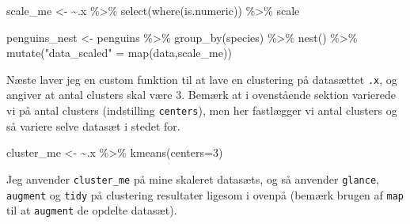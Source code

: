 \documentclass[
]{book}
\newenvironment{Shaded}{\begin{snugshade}}{\end{snugshade}}
\newcommand{\AttributeTok}[1]{\textcolor[rgb]{0.77,0.63,0.00}{#1}}
\newcommand{\DecValTok}[1]{\textcolor[rgb]{0.00,0.00,0.81}{#1}}
\newcommand{\ErrorTok}[1]{\textcolor[rgb]{0.64,0.00,0.00}{\textbf{#1}}}
\newcommand{\FunctionTok}[1]{\textcolor[rgb]{0.00,0.00,0.00}{#1}}
\newcommand{\NormalTok}[1]{#1}
\newcommand{\OtherTok}[1]{\textcolor[rgb]{0.56,0.35,0.01}{#1}}
\newcommand{\SpecialCharTok}[1]{\textcolor[rgb]{0.00,0.00,0.00}{#1}}
\newcommand{\StringTok}[1]{\textcolor[rgb]{0.31,0.60,0.02}{#1}}
\begin{document}
\begin{Shaded}
\begin{Highlighting}[]
\NormalTok{scale\_me }\OtherTok{\textless{}{-}} \ErrorTok{\textasciitilde{}}\NormalTok{.x }\SpecialCharTok{\%\textgreater{}\%} \FunctionTok{select}\NormalTok{(}\FunctionTok{where}\NormalTok{(is.numeric)) }\SpecialCharTok{\%\textgreater{}\%}\NormalTok{ scale}

\NormalTok{penguins\_nest }\OtherTok{\textless{}{-}}\NormalTok{ penguins }\SpecialCharTok{\%\textgreater{}\%} 
  \FunctionTok{group\_by}\NormalTok{(species) }\SpecialCharTok{\%\textgreater{}\%}
  \FunctionTok{nest}\NormalTok{() }\SpecialCharTok{\%\textgreater{}\%}
  \FunctionTok{mutate}\NormalTok{(}\StringTok{"data\_scaled"} \OtherTok{=} \FunctionTok{map}\NormalTok{(data,scale\_me))}
\end{Highlighting}
\end{Shaded}

Næste laver jeg en custom funktion til at lave en clustering på datasættet \texttt{.x}, og angiver at antal clusters skal være 3. Bemærk at i ovenstående sektion varierede vi på antal clusters (indstilling \texttt{centers}), men her fastlægger vi antal clusters og så variere selve datasæt i stedet for.

\begin{Shaded}
\begin{Highlighting}[]
\NormalTok{cluster\_me }\OtherTok{\textless{}{-}} \ErrorTok{\textasciitilde{}}\NormalTok{.x }\SpecialCharTok{\%\textgreater{}\%} \FunctionTok{kmeans}\NormalTok{(}\AttributeTok{centers=}\DecValTok{3}\NormalTok{)}
\end{Highlighting}
\end{Shaded}

Jeg anvender \texttt{cluster\_me} på mine skaleret datasæts, og så anvender \texttt{glance}, \texttt{augment} og \texttt{tidy} på clustering resultater ligesom i ovenpå (bemærk brugen af \texttt{map} til at \texttt{augment} de opdelte datasæt).
\end{document}
